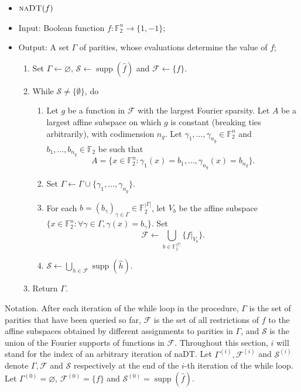 \documentclass{toc}
\DeclareMathOperator{\Supp}{supp}
\newcommand{\F}{{\mathbb F}}
\begin{document}
\newcommand{\nadtproc}{\text{\sc naDT}}
\begin{itemize}
\item[] $\nadtproc(f)$
\item[] Input: Boolean function $f: \F_2^n \to \{1,-1\}$;
\item[] Output: A set $\Gamma$ of parities, whose evaluations determine the value of $f$;
\begin{enumerate}
\item Set $\Gamma \gets \varnothing$, $\mathcal{S} \gets\Supp(\widehat{f})$
  and 
  $\mathcal{F} \gets \{f\}$.
\item\label{step:while} While $\mathcal{S} \neq \{\emptyset\}$, do
\begin{enumerate}
\item\label{step:chooseg} Let $g$ be a function in $\mathcal{F}$ with the largest Fourier
  sparsity. Let $A$ be a largest
  affine subspace on which $g$ is constant (breaking ties arbitrarily), with codimension $n_g$.  Let $\gamma_1,\ldots,\gamma_{n_g} \in \F_2^n$ and
  $b_1, \ldots, b_{n_g} \in \mathbb{F}_2$ be such that
  \[
    A=\{x \in \F_2^n :
    \gamma_1(x)=b_1, \ldots, \gamma_{n_g}(x) = b_{n_g}\}.
  \]
\item Set $\Gamma \gets \Gamma \cup \{\gamma_1,\ldots,
  \gamma_{n_g}\}$.
\item For each $b=(b_\gamma)_{\gamma \in \Gamma} \in
  \mathbb{F}_2^{|\Gamma|}$, let $V_b$ be the affine subspace $\{x \in \F_2^n:
  \forall \gamma \in \Gamma, \gamma(x) = b_\gamma\}$.  Set
  \[
    \mathcal{F} \gets \bigcup_{b \in \mathbb{F}_2^{|\Gamma|}} \{f |_{V_b}\}.
  \]
\item $\mathcal{S} \gets \bigcup_{h \in \mathcal{F}} \Supp(\widehat{h})$.
\end{enumerate}
\item Return $\Gamma$.
\end{enumerate}
\end{itemize}
\noindent   %
Notation.  %
After each iteration of the while loop in the procedure,
$\Gamma$ is the set of parities that have been queried so far,
$\mathcal{F}$ is the set of all restrictions of $f$ to the affine
subspaces obtained by different assignments to parities in $\Gamma$,
and $\mathcal{S}$ is the union of the Fourier supports of functions in
$\mathcal{F}$. Throughout this section, $i$ will stand for the index of an arbitrary iteration
of {\sc naDT}. Let  $\Gamma^{(i)}, \mathcal{F}^{(i)}$ and
$\mathcal{S}^{(i)}$ denote $\Gamma, \mathcal{F}$ and $\mathcal{S}$
respectively at the end of the $i$-th iteration of the while loop. Let  $\Gamma^{(0)}=\varnothing$,  
$\mathcal{F}^{(0)}=\{f\}$ and $\mathcal{S}^{(0)}=\Supp(\widehat{f})$.
\end{document}
